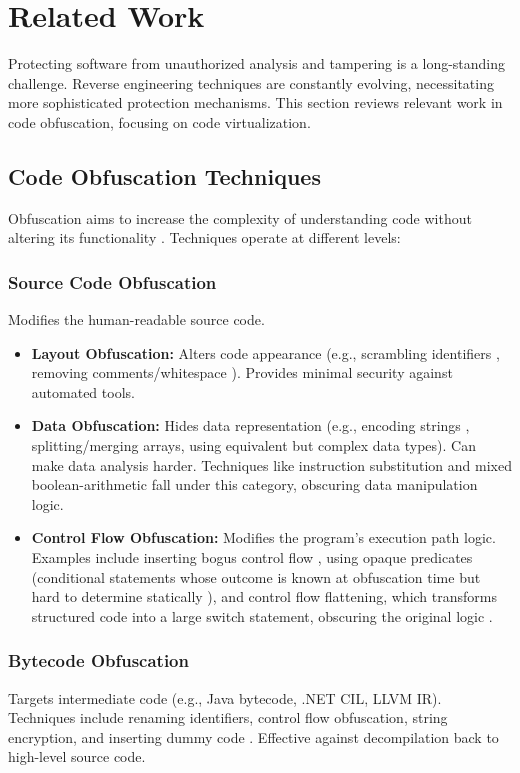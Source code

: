\section{Related Work} \label{sec:related_work}
Protecting software from unauthorized analysis and tampering is a long-standing challenge. Reverse engineering techniques are constantly evolving, necessitating more sophisticated protection mechanisms. This section reviews relevant work in code obfuscation, focusing on code virtualization.

\subsection{Code Obfuscation Techniques}
Obfuscation aims to increase the complexity of understanding code without altering its functionality \cite{Jin24}. Techniques operate at different levels:

\subsubsection{Source Code Obfuscation} Modifies the human-readable source code.
\begin{itemize}
    \item \textbf{Layout Obfuscation:} Alters code appearance (e.g., scrambling identifiers \cite{Cha04}, removing comments/whitespace \cite{Bal11}). Provides minimal security against automated tools.
    \item \textbf{Data Obfuscation:} Hides data representation (e.g., encoding strings \cite{Ert05, Fuk08, Kov13}, splitting/merging arrays, using equivalent but complex data types). Can make data analysis harder. Techniques like instruction substitution \cite{LeD12, Dar10} and mixed boolean-arithmetic \cite{Liu21, Sch22, Zho07} fall under this category, obscuring data manipulation logic.
    \item \textbf{Control Flow Obfuscation:} Modifies the program's execution path logic. Examples include inserting bogus control flow \cite{LiY211}, using opaque predicates (conditional statements whose outcome is known at obfuscation time but hard to determine statically \cite{XuD16}), and control flow flattening, which transforms structured code into a large switch statement, obscuring the original logic \cite{Lás09}.
\end{itemize}

\subsubsection{Bytecode Obfuscation} Targets intermediate code (e.g., Java bytecode, .NET CIL, LLVM IR). Techniques include renaming identifiers, control flow obfuscation, string encryption, and inserting dummy code \cite{Pie18, Yak20}. Effective against decompilation back to high-level source code.

